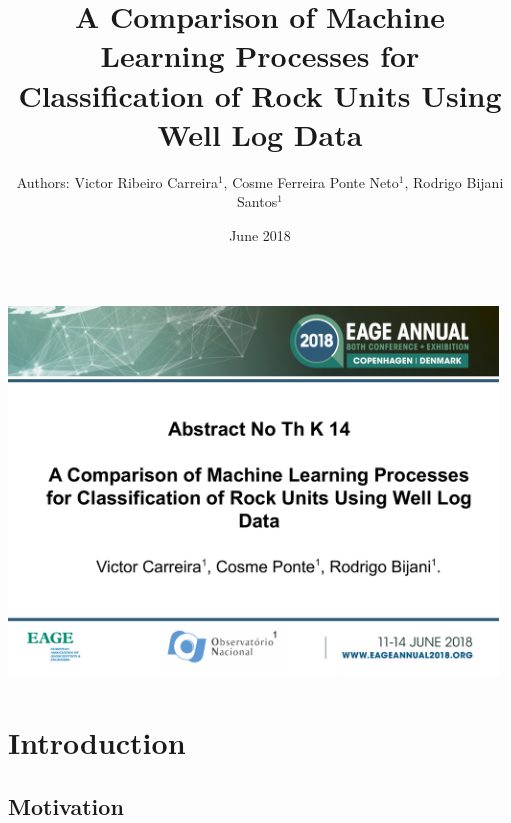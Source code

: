 \documentclass[aspectratio=10]{beamer} %
\author[Carreira,V.R.]{Authors: Victor Ribeiro Carreira$^{1}$, Cosme Ferreira Ponte Neto$^{1}$, Rodrigo Bijani Santos$^{1}$}
\title{A Comparison of Machine Learning Processes for Classification of Rock Units Using Well Log Data}
\institute{Observatório Nacional$^{1}$}
\date{June 2018}
\begin{document}
	\bgroup
	\makeatletter
	\makeatother

\egroup 
{}
\setcounter{framenumber}{-1}
\AtBeginSection[]


\begin{frame}
 \flushbottom
 \setlength{\parskip}{-1ex plus 1ex }
 \setlength{\parindent}{-15pt}
 \includegraphics[width=13cm,height=10cm]{Imagens/front.pdf}
\end{frame}


\section{Introduction}

\subsection{Motivation}
\end{document}
